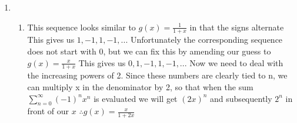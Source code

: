 \documentclass{article}
\begin{document}
\begin{enumerate}
		\item
		\begin{enumerate}
			\item This sequence looks similar to $g(x)=\frac{1}{1+x}$ in that the signs alternate
			\newline This gives us $1,-1,1,-1,...$
			\newline Unfortunately the corresponding sequence does not start with 0, but we can fix this by amending our guess to $g(x)=\frac{x}{1+x}$
			\newline This gives us $0,1,-1,1,-1,...$
			\newline Now we need to deal with the increasing powers of 2. Since these numbers are clearly tied to n, we can multiply x in the denominator by 2, so that when the sum $\sum\limits_{n=0}^{\infty}(-1)^nx^n$ is evaluated we will get $(2x)^n$ and subsequently $2^n$ in front of our $x$
			\newline $\therefore g(x)=\frac{x}{1+2x}$ 
		\end{enumerate}
		
	\end{enumerate}
\end{document}
